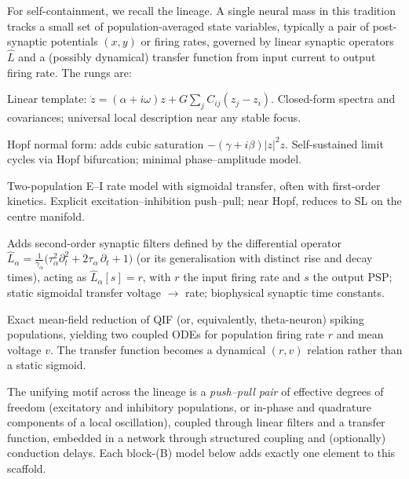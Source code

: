 \documentclass[11pt,a4paper]{article}
\begin{document}
For self-containment, we recall the lineage. A single neural mass in this tradition tracks a small set of population-averaged state variables, typically a pair of post-synaptic potentials $(x,y)$ or firing rates, governed by linear synaptic operators $\hat L$ and a (possibly dynamical) transfer function from input current to output firing rate. The rungs are:

\begin{description}[leftmargin=2cm,style=nextline,labelwidth=1.8cm]
\item[Phase / damped oscillator] Linear template: $\dot z = (\alpha + i\omega) z + G\sum_j C_{ij}(z_j - z_i)$. Closed-form spectra and covariances; universal local description near any stable focus.
\item[Stuart--Landau (SL)] Hopf normal form: adds cubic saturation $-(\gamma+i\beta)|z|^2 z$. Self-sustained limit cycles via Hopf bifurcation; minimal phase--amplitude model.
\item[Wilson--Cowan (WILCO)] Two-population E--I rate model with sigmoidal transfer, often with first-order kinetics. Explicit excitation--inhibition push--pull; near Hopf, reduces to SL on the centre manifold.
\item[NMM1 (Jansen--Rit, Wendling, LaNMM)] Adds second-order synaptic filters defined by the differential operator $\hat L_\alpha = \frac{1}{\gamma_\alpha}\bigl(\tau_\alpha^2 \partial_t^2 + 2\tau_\alpha\,\partial_t + 1\bigr)$ (or its generalisation with distinct rise and decay times), acting as $\hat L_\alpha[s] = r$, with $r$ the input firing rate and $s$ the output PSP; static sigmoidal transfer voltage $\to$ rate; biophysical synaptic time constants.
\item[NMM2 (MPR / theta-neuron Ott--Antonsen)] Exact mean-field reduction of QIF (or, equivalently, theta-neuron) spiking populations, yielding two coupled ODEs for population firing rate $r$ and mean voltage $v$. The transfer function becomes a dynamical $(r,v)$ relation rather than a static sigmoid.
\end{description}

The unifying motif across the lineage is a \emph{push--pull pair} of effective degrees of freedom (excitatory and inhibitory populations, or in-phase and quadrature components of a local oscillation), coupled through linear filters and a transfer function, embedded in a network through structured coupling and (optionally) conduction delays. Each block-(B) model below adds exactly one element to this scaffold.
\end{document}
